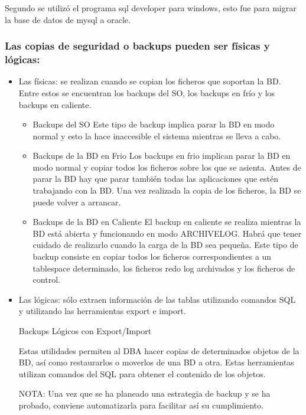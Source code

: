 \documentclass[a4paper,openright,12pt]{book}
\begin{document}
Segundo se utilizó el programa sql developer para windows, esto fue para migrar la base de datos de mysql a oracle.



\subsubsection{Las copias de seguridad o backups pueden ser físicas y lógicas:}


\begin{itemize}


\item Las físicas: 
se realizan cuando se copian los ficheros que soportan la BD. Entre estos se encuentran los backups del SO, los backups en frío y los backups en caliente.
\begin{itemize}



\item Backups del SO
Este tipo de backup implica parar la BD en modo normal y esto la hace inaccesible el sistema mientras se lleva a cabo.

 \item Backups de la BD en Frio
Los backups en frio implican parar la BD en modo normal y copiar todos los ficheros sobre los que se asienta. Antes de parar la BD hay que parar también todas las aplicaciones que estén trabajando con la BD. Una vez realizada la copia de los ficheros, la BD se puede volver a arrancar.

\item Backups de la BD en Caliente
El backup en caliente se realiza mientras la BD está abierta y funcionando en modo ARCHIVELOG. Habrá que tener cuidado de realizarlo cuando la carga de la BD sea pequeña. Este tipo de backup consiste en copiar todos los ficheros correspondientes a un tablespace determinado, los ficheros redo log archivados y los ficheros de control.
\end{itemize}

\item Las lógicas:
 sólo extraen información de las tablas utilizando comandos SQL y utilizando las herramientas export e import.

Backups Lógicos con Export/Import

Estas utilidades permiten al DBA hacer copias de determinados objetos de la BD, así como restaurarlos o moverlos de una BD a otra. Estas herramientas utilizan comandos del SQL para obtener el contenido de los objetos.

NOTA: Una vez que se ha planeado una estrategia de backup y se ha probado, conviene automatizarla para facilitar así su cumplimiento.

\end{itemize}
\end{document}
